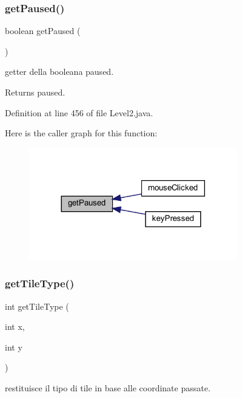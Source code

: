 \subsubsection{\texorpdfstring{get\+Paused()}{getPaused()}}
{\footnotesize\ttfamily boolean get\+Paused (\begin{DoxyParamCaption}{ }\end{DoxyParamCaption})}



getter della booleana paused. 

\begin{DoxyReturn}{Returns}
paused. 
\end{DoxyReturn}


Definition at line 456 of file Level2.\+java.

Here is the caller graph for this function\+:\nopagebreak
\begin{figure}[H]
\begin{center}
\leavevmode
\includegraphics[width=257pt]{classscenes_1_1_level2_af5e9f906de91e4d6400bb7f27cd563f3_icgraph}
\end{center}
\end{figure}
\mbox{\label{classscenes_1_1_level2_ac689e72523c8460ac3160526d310b1b7}} 
\subsubsection{\texorpdfstring{get\+Tile\+Type()}{getTileType()}}
{\footnotesize\ttfamily int get\+Tile\+Type (\begin{DoxyParamCaption}\item[{int}]{x,  }\item[{int}]{y }\end{DoxyParamCaption})}



restituisce il tipo di tile in base alle coordinate passate. 


